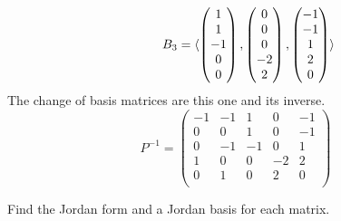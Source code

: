 \begin{exercises}
\begin{answer}
\begin{exparts}
\begin{equation*}
            \qquad
             B_3=\langle\begin{pmatrix} 1 \\ 1 \\ -1 \\ 0 \\ 0 \end{pmatrix},
                 \begin{pmatrix} 0 \\ 0 \\  0 \\-2 \\ 2 \end{pmatrix},
                 \begin{pmatrix} -1\\-1 \\  1 \\ 2 \\ 0 \end{pmatrix}\rangle
          \end{equation*}
          The change of basis matrices are this one and its inverse.
          \begin{equation*}
            P^{-1}=
            \begin{pmatrix}
              -1  &-1  &1  &0  &-1  \\
              0   &0   &1  &0  &-1  \\
              0   &-1  &-1 &0  &1   \\
              1   &0   &0  &-2 &2   \\
              0   &1   &0  &2  &0   \\
            \end{pmatrix}
          \end{equation*}
      \end{exparts}
    \end{answer}
  \recommended \item 
    Find the Jordan form and a Jordan basis for each matrix.
\end{exercises}
